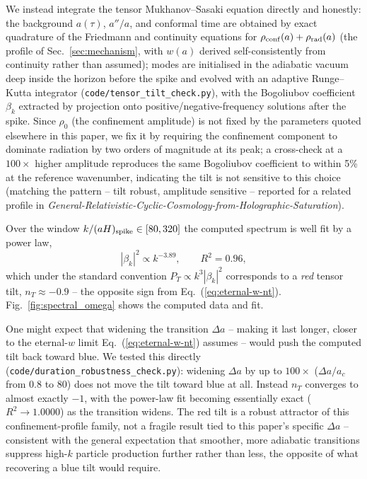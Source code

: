 \documentclass[twocolumn, PRD, amsmath, amssymb, aps, nofootinbib]{revtex4-2}
\begin{document}
We instead integrate the tensor Mukhanov--Sasaki equation directly and honestly: the background $a(\tau)$, $a''/a$, and conformal time are obtained by exact quadrature of the Friedmann and continuity equations for $\rho_{\rm conf}(a)+\rho_{\rm rad}(a)$ (the profile of Sec.~\ref{sec:mechanism}, with $w(a)$ derived self-consistently from continuity rather than assumed); modes are initialised in the adiabatic vacuum deep inside the horizon before the spike and evolved with an adaptive Runge--Kutta integrator (\texttt{code/tensor\_tilt\_check.py}), with the Bogoliubov coefficient $\beta_k$ extracted by projection onto positive/negative-frequency solutions after the spike. Since $\rho_0$ (the confinement amplitude) is not fixed by the parameters quoted elsewhere in this paper, we fix it by requiring the confinement component to dominate radiation by two orders of magnitude at its peak; a cross-check at a $100\times$ higher amplitude reproduces the same Bogoliubov coefficient to within 5\% at the reference wavenumber, indicating the tilt is not sensitive to this choice (matching the pattern -- tilt robust, amplitude sensitive -- reported for a related profile in \emph{General-Relativistic-Cyclic-Cosmology-from-Holographic-Saturation}).

Over the window $k/(aH)_{\rm spike}\in[80,320]$ the computed spectrum is well fit by a power law,
\begin{equation}
|\beta_k|^2 \propto k^{-3.89}, \qquad R^2=0.96,
\end{equation}
which under the standard convention $P_T\propto k^3|\beta_k|^2$ corresponds to a \emph{red} tensor tilt, $n_T\approx-0.9$ -- the opposite sign from Eq.~(\ref{eq:eternal-w-nt}). Fig.~\ref{fig:spectral_omega} shows the computed data and fit.

One might expect that widening the transition $\Delta a$ -- making it last longer, closer to the eternal-$w$ limit Eq.~(\ref{eq:eternal-w-nt}) assumes -- would push the computed tilt back toward blue. We tested this directly (\texttt{code/duration\_robustness\_check.py}): widening $\Delta a$ by up to $100\times$ ($\Delta a/a_c$ from $0.8$ to $80$) does not move the tilt toward blue at all. Instead $n_T$ converges to almost exactly $-1$, with the power-law fit becoming essentially exact ($R^2\to1.0000$) as the transition widens. The red tilt is a robust attractor of this confinement-profile family, not a fragile result tied to this paper's specific $\Delta a$ -- consistent with the general expectation that smoother, more adiabatic transitions suppress high-$k$ particle production further rather than less, the opposite of what recovering a blue tilt would require.
\end{document}
